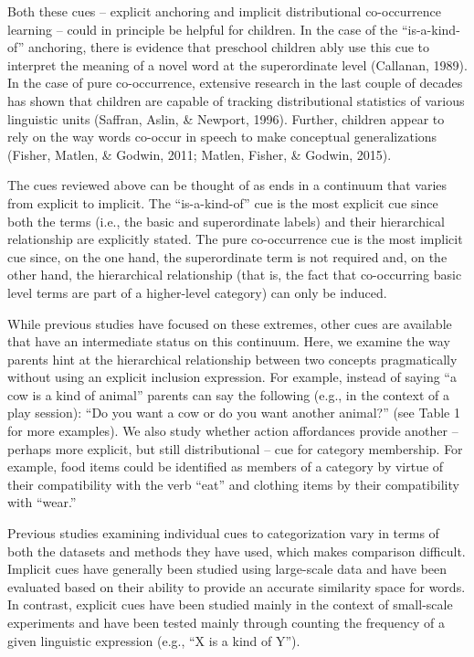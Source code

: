 \documentclass[10pt, letterpaper]{article}
\begin{document}
Both these cues -- explicit anchoring and implicit distributional
co-occurrence learning -- could in principle be helpful for children. In
the case of the ``is-a-kind-of'' anchoring, there is evidence that
preschool children ably use this cue to interpret the meaning of a novel
word at the superordinate level (Callanan, 1989). In the case of pure
co-occurrence, extensive research in the last couple of decades has
shown that children are capable of tracking distributional statistics of
various linguistic units (Saffran, Aslin, \& Newport, 1996). Further,
children appear to rely on the way words co-occur in speech to make
conceptual generalizations (Fisher, Matlen, \& Godwin, 2011; Matlen,
Fisher, \& Godwin, 2015).

The cues reviewed above can be thought of as ends in a continuum that
varies from explicit to implicit. The ``is-a-kind-of'' cue is the most
explicit cue since both the terms (i.e., the basic and superordinate
labels) and their hierarchical relationship are explicitly stated. The
pure co-occurrence cue is the most implicit cue since, on the one hand,
the superordinate term is not required and, on the other hand, the
hierarchical relationship (that is, the fact that co-occurring basic
level terms are part of a higher-level category) can only be induced.

While previous studies have focused on these extremes, other cues are
available that have an intermediate status on this continuum. Here, we
examine the way parents hint at the hierarchical relationship between
two concepts pragmatically without using an explicit inclusion
expression. For example, instead of saying ``a cow is a kind of animal''
parents can say the following (e.g., in the context of a play session):
``Do you want a cow or do you want another animal?'' (see Table 1 for
more examples). We also study whether action affordances provide another
-- perhaps more explicit, but still distributional -- cue for category
membership. For example, food items could be identified as members of a
category by virtue of their compatibility with the verb ``eat'' and
clothing items by their compatibility with ``wear.''

Previous studies examining individual cues to categorization vary in
terms of both the datasets and methods they have used, which makes
comparison difficult. Implicit cues have generally been studied using
large-scale data and have been evaluated based on their ability to
provide an accurate similarity space for words. In contrast, explicit
cues have been studied mainly in the context of small-scale experiments
and have been tested mainly through counting the frequency of a given
linguistic expression (e.g., ``X is a kind of Y'').
\end{document}

